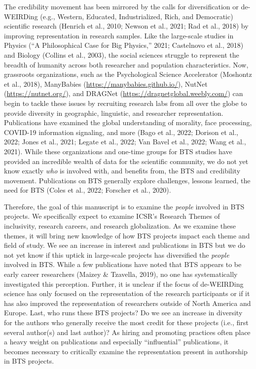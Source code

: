 \documentclass[
  man]{apa7}
\begin{document}
The credibility movement has been mirrored by the calls for
diversification or de-WEIRDing (e.g., Western, Educated, Industrialized,
Rich, and Democratic) scientific research (Henrich et al., 2010; Newson et al., 2021; Rad et al., 2018) by improving representation in research samples. Like the
large-scale studies in Physics ({``A Philosophical Case for Big Physics,''} 2021; Castelnovo et al., 2018) and
Biology (Collins et al., 2003), the social sciences struggle to represent the
breadth of humanity across both researcher and population
characteristics. Now, grassroots organizations, such as the
Psychological Science Accelerator (Moshontz et al., 2018), ManyBabies
(\url{https://manybabies.github.io/}), NutNet (\url{https://nutnet.org/}), and
DRAGNet (\url{https://dragnetglobal.weebly.com/}) can begin to tackle these
issues by recruiting research labs from all over the globe to provide
diversity in geographic, linguistic, and researcher representation.
Publications have examined the global understanding of morality, face
processing, COVID-19 information signaling, and more (Bago et al., 2022; Dorison et al., 2022; Jones et al., 2021; Legate et al., 2022; Van Bavel et al., 2022; Wang et al., 2021). While
these organizations and one-time groups for BTS studies have provided an
incredible wealth of data for the scientific community, we do not yet
know exactly \emph{who} is involved with, and benefits from, the BTS and
credibility movement. Publications on BTS generally explore challenges,
lessons learned, the need for BTS (Coles et al., 2022; Forscher et al., 2020).

Therefore, the goal of this manuscript is to examine the \emph{people}
involved in BTS projects. We specifically expect to examine ICSR's
Research Themes of inclusivity, research careers, and research
globalization. As we examine these themes, it will bring new knowledge
of how BTS projects impact each theme and field of study. We see an
increase in interest and publications in BTS but we do not yet know if
this uptick in large-scale projects has diversified the \emph{people}
involved in BTS. While a few publications have noted that BTS appears to
be early career researchers (Maizey \& Tzavella, 2019), no one has systematically
investigated this perception. Further, it is unclear if the focus of
de-WEIRDing science has only focused on the representation of the
research participants or if it has also improved the representation of
researchers outside of North America and Europe. Last, who runs these
BTS projects? Do we see an increase in diversity for the authors who
generally receive the most credit for these projects (i.e., first
several author(s) and last author)? As hiring and promoting practices
often place a heavy weight on publications and especially ``influential''
publications, it becomes necessary to critically examine the
representation present in authorship in BTS projects.
\end{document}

